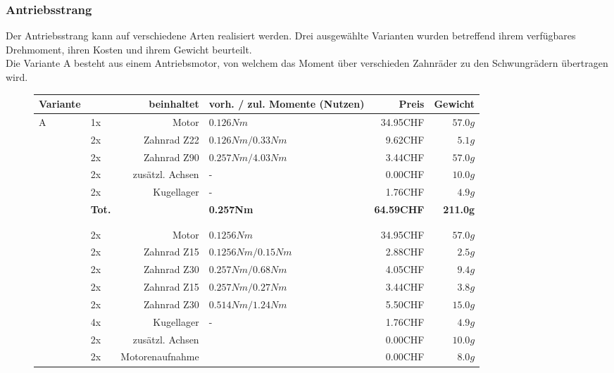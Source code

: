 ﻿\subsubsection{Antriebsstrang}

Der Antriebsstrang kann auf verschiedene Arten realisiert werden. Drei ausgewählte Varianten wurden betreffend ihrem verfügbares Drehmoment, ihren Kosten und ihrem Gewicht beurteilt.\\
Die Variante A besteht aus einem Antriebsmotor, von welchem das Moment über verschieden Zahnräder zu den Schwungrädern übertragen wird.    





\begin{figure}[h!]
    \begin{tabular}{p{0.5cm}p{0.8cm}rp{3cm}rr}
    \textbf{Variante} & \multicolumn{2}{r}{\textbf{beinhaltet}} & \textbf{vorh. / zul. Momente (Nutzen)} & \textbf{Preis} & \textbf{Gewicht} \\\hline

    \multirow{9}[2]{*}{A}
          & 1x    & Motor           & $0.126 Nm$           & 34.95CHF & $57.0 g$ \\
          & 2x    & Zahnrad Z22     & $0.126 Nm / 0.33 Nm$ &  9.62CHF & $5.1 g$  \\
          & 2x    & Zahnrad Z90     & $0.257 Nm / 4.03 Nm$ &  3.44CHF & $57.0 g$ \\
          & 2x    & zusätzl. Achsen & -                    &  0.00CHF & $10.0 g$ \\
          & 2x    & Kugellager      & -                    &  1.76CHF & $4.9 g$  \\
       
      
          & \textbf{Tot.} &  & \textbf{0.257Nm} & \textbf{64.59CHF} & \textbf{211.0g} \\
    \multirow{10}[2]{*}{B}
  	  &       &                 &                      &          &  \\
          &       &                 &                      &          &  \\
          & 2x    & Motor           & $0.1256 Nm$          & 34.95CHF & $57.0 g$ \\
          & 2x    & Zahnrad Z15     & $0.1256 Nm / 0.15 Nm$& 2.88CHF  & $2.5 g$  \\
          & 2x    & Zahnrad Z30     & $0.257 Nm / 0.68 Nm$ & 4.05CHF  & $9.4 g$  \\
          & 2x    & Zahnrad Z15     & $0.257 Nm / 0.27 Nm$ & 3.44CHF  & $3.8 g$  \\
          & 2x    & Zahnrad Z30     & $0.514 Nm / 1.24 Nm$ & 5.50CHF  & $15.0 g$ \\
          & 4x    & Kugellager      & -                    & 1.76CHF  & $4.9 g$  \\
          & 2x    & zusätzl. Achsen &                      & 0.00CHF  & $10.0 g$ \\
          & 2x    & Motorenaufnahme &                      & 0.00CHF  & $8.0 g$  \\
        

\end{tabular}
\end{figure}
